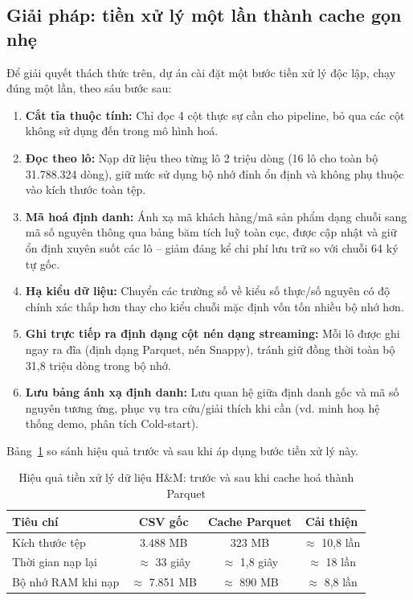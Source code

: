 \subsection{Giải pháp: tiền xử lý một lần thành cache gọn nhẹ}
\label{subsec:hm_caching}

Để giải quyết thách thức trên, dự án cài đặt một bước tiền xử lý độc lập, chạy đúng một lần, theo sáu bước sau:
\begin{enumerate}
    \item \textbf{Cắt tỉa thuộc tính:} Chỉ đọc 4 cột thực sự cần cho pipeline, bỏ qua các cột không sử dụng đến trong mô hình hoá.
    \item \textbf{Đọc theo lô:} Nạp dữ liệu theo từng lô 2 triệu dòng (16 lô cho toàn bộ 31.788.324 dòng), giữ mức sử dụng bộ nhớ đỉnh ổn định và không phụ thuộc vào kích thước toàn tệp.
    \item \textbf{Mã hoá định danh:} Ánh xạ mã khách hàng/mã sản phẩm dạng chuỗi sang mã số nguyên thông qua bảng băm tích luỹ toàn cục, được cập nhật và giữ ổn định xuyên suốt các lô -- giảm đáng kể chi phí lưu trữ so với chuỗi 64 ký tự gốc.
    \item \textbf{Hạ kiểu dữ liệu:} Chuyển các trường số về kiểu số thực/số nguyên có độ chính xác thấp hơn thay cho kiểu chuỗi mặc định vốn tốn nhiều bộ nhớ hơn.
    \item \textbf{Ghi trực tiếp ra định dạng cột nén dạng streaming:} Mỗi lô được ghi ngay ra đĩa (định dạng Parquet, nén Snappy), tránh giữ đồng thời toàn bộ 31,8 triệu dòng trong bộ nhớ.
    \item \textbf{Lưu bảng ánh xạ định danh:} Lưu quan hệ giữa định danh gốc và mã số nguyên tương ứng, phục vụ tra cứu/giải thích khi cần (vd. minh hoạ hệ thống demo, phân tích Cold-start).
\end{enumerate}

Bảng~\ref{tab:hm_cache} so sánh hiệu quả trước và sau khi áp dụng bước tiền xử lý này.

\begin{table}[htbp]
    \centering
    \caption{Hiệu quả tiền xử lý dữ liệu H\&M: trước và sau khi cache hoá thành Parquet}
    \label{tab:hm_cache}
    \begin{tabular}{|l|c|c|c|}
        \hline
        \textbf{Tiêu chí} & \textbf{CSV gốc} & \textbf{Cache Parquet} & \textbf{Cải thiện} \\
        \hline
        Kích thước tệp & 3.488 MB & 323 MB & $\approx$ 10,8 lần \\
        \hline
        Thời gian nạp lại & $\approx$ 33 giây & $\approx$ 1,8 giây & $\approx$ 18 lần \\
        \hline
        Bộ nhớ RAM khi nạp & $\approx$ 7.851 MB & $\approx$ 890 MB & $\approx$ 8,8 lần \\
        \hline
    \end{tabular}
\end{table}

